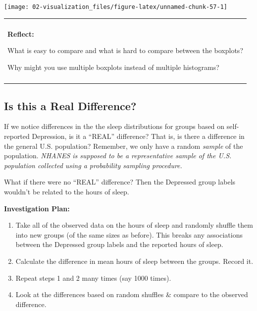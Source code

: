 \documentclass[
]{book}
\providecommand{\tightlist}{%
  \setlength{\itemsep}{0pt}\setlength{\parskip}{0pt}}
\newenvironment{reflect}
{
    \begin{center}
    
    \begin{tabular}{|p{0.8\textwidth}|}
    \rowcolor{LightBlue}
    \hline\\
    \rowcolor{LightBlue}
    \textbf{Reflect:}
}
{
    \\\rowcolor{LightBlue}
    \\\hline
    \end{tabular} 
    \end{center}
}
\begin{document}
\begin{center}\texttt{[image: 02-visualization\_files/figure-latex/unnamed-chunk-57-1]} \end{center}

\begin{reflect}
What is easy to compare and what is hard to compare between the
boxplots?

Why might you use multiple boxplots instead of multiple histograms?
\end{reflect}

\subsection{Is this a Real Difference?}\label{is-this-a-real-difference}

If we notice differences in the the sleep distributions for groups based on self-reported Depression, is it a ``REAL'' difference? That is, is there a difference in the general U.S. population? Remember, we only have a random \emph{sample} of the population. \emph{NHANES is supposed to be a representative sample of the U.S. population collected using a probability sampling procedure.}

What if there were no ``REAL'' difference? Then the Depressed group labels wouldn't be related to the hours of sleep.

\textbf{Investigation Plan:}

\begin{enumerate}
\def\labelenumi{\arabic{enumi}.}
\tightlist
\item
  Take all of the observed data on the hours of sleep and randomly shuffle them into new groups (of the same sizes as before). This breaks any associations between the Depressed group labels and the reported hours of sleep.
\item
  Calculate the difference in mean hours of sleep between the groups. Record it.
\item
  Repeat steps 1 and 2 many times (say 1000 times).
\item
  Look at the differences based on random shuffles \& compare to the observed difference.
\end{enumerate}
\end{document}
